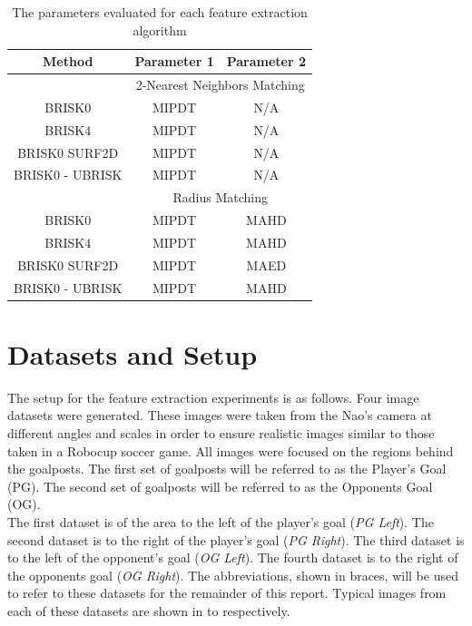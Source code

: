 \documentclass{report}
\begin{document}
\begin{table}
\caption{The parameters evaluated for each feature extraction algorithm}
\begin{tabular}{|c|c|c|}
\hline 
Method & Parameter 1 & Parameter 2\tabularnewline
\hline 
 & \multicolumn{2}{c}{2-Nearest Neighbors Matching}\tabularnewline
\hline 
BRISK0 & MIPDT & N/A\tabularnewline
\hline 
BRISK4 & MIPDT & N/A\tabularnewline
\hline 
BRISK0 SURF2D & MIPDT & N/A\tabularnewline
\hline 
BRISK0 - UBRISK & MIPDT & N/A\tabularnewline
\hline 
 & \multicolumn{2}{c}{Radius Matching}\tabularnewline
\hline 
BRISK0 & MIPDT & MAHD\tabularnewline
\hline 
BRISK4 & MIPDT & MAHD\tabularnewline
\hline 
BRISK0 SURF2D & MIPDT & MAED\tabularnewline
\hline 
BRISK0 - UBRISK & MIPDT & MAHD\tabularnewline
\hline 
\end{tabular}
\label{tab:parameters}
\end{table}

\section{Datasets and Setup}
\label{sec:datasets}
The setup for the feature extraction experiments is as follows. Four image datasets were generated. These images were taken from the Nao's camera at different angles and scales in order to ensure realistic images similar to those taken in a Robocup soccer game. All images were focused on the regions behind the goalposts. The first set of goalposts will be referred to as the Player's Goal (PG). The second set of goalposts will be referred to as the Opponents Goal (OG). \\


The first dataset is of the area to the left of the player's goal (\textit{PG Left}). The second dataset is to the right of the player's goal (\textit{PG Right}). The third dataset is to the left of the opponent's goal (\textit{OG Left}). The fourth dataset is to the right of the opponents goal (\textit{OG Right}). The abbreviations, shown in braces, will be used to refer to these datasets for the remainder of this report. Typical images from each of these datasets are shown in  to  respectively.\\
\end{document}
